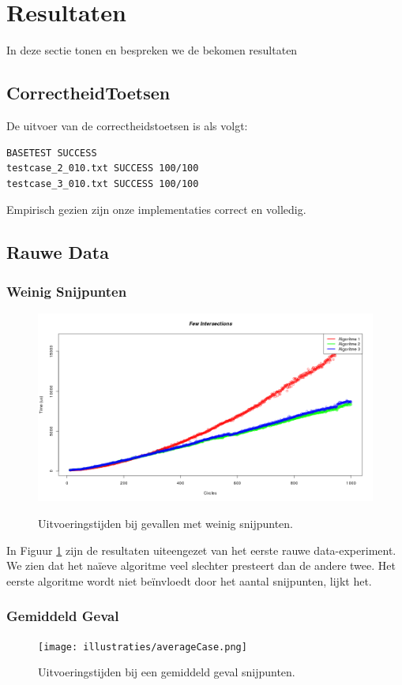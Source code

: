 \newpage
\section{Resultaten}
In deze sectie tonen en bespreken we de bekomen resultaten


\subsection{CorrectheidToetsen}
De uitvoer van de correctheidstoetsen is als volgt:
\begin{verbatim}
BASETEST SUCCESS
testcase_2_010.txt SUCCESS 100/100
testcase_3_010.txt SUCCESS 100/100
\end{verbatim}
Empirisch gezien zijn onze implementaties correct en volledig.

\subsection{Rauwe Data}
\subsubsection{Weinig Snijpunten}
\begin{figure}[H]
   	\centering
   	\includegraphics[width=\textwidth]{illustraties/fewIntersections.png}
  	\label{fig:few_intersections}
  	\caption{Uitvoeringstijden bij gevallen met weinig snijpunten.}
\end{figure}
In Figuur \ref{fig:few_intersections} zijn de resultaten uiteengezet van het eerste rauwe data-experiment. We zien dat het na\"ieve algoritme veel slechter presteert dan de andere twee. Het eerste algoritme wordt niet be\"invloedt door het aantal snijpunten, lijkt het.

\subsubsection{Gemiddeld Geval}
\begin{figure}[H]
	\centering
   	\texttt{[image: illustraties/averageCase.png]}
  	\label{fig:average_case}
  	\caption{Uitvoeringstijden bij een gemiddeld geval snijpunten.}
\end{figure}
   
